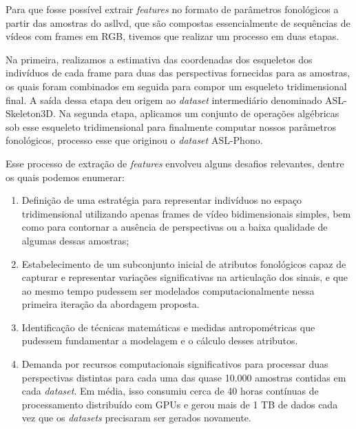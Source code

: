 Para que fosse possível extrair \textit{features} no formato de parâmetros fonológicos a partir das amostras do \acrshort{asllvd}, que são compostas essencialmente de sequências de vídeos com frames em RGB, tivemos que realizar um processo em duas etapas.

Na primeira, realizamos a estimativa das coordenadas dos esqueletos dos indivíduos de cada frame para duas das perspectivas fornecidas para as amostras, os quais foram combinados em seguida para compor um esqueleto tridimensional final. A saída dessa etapa deu origem ao \textit{dataset} intermediário denominado ASL-Skeleton3D.
Na segunda etapa, aplicamos um conjunto de operações algébricas sob esse esqueleto tridimensional para finalmente computar nossos parâmetros fonológicos, processo esse que originou o \textit{dataset} ASL-Phono.


Esse processo de extração de \textit{features} envolveu alguns desafios relevantes, dentre os quais podemos enumerar:

\begin{enumerate}
    \item Definição de uma estratégia para representar indivíduos no espaço tridimensional utilizando apenas frames de vídeo bidimensionais simples, bem como para contornar a ausência de perspectivas ou a baixa qualidade de algumas dessas amostras;

    \item Estabelecimento de um subconjunto inicial de atributos fonológicos capaz de capturar e representar variações significativas na articulação dos sinais, e que ao mesmo tempo pudessem ser modelados computacionalmente nessa primeira iteração da abordagem proposta.

    \item Identificação de técnicas matemáticas e medidas antropométricas que pudessem fundamentar a modelagem e o cálculo desses atributos.

    \item Demanda por recursos computacionais significativos para processar duas perspectivas distintas para cada uma das quase 10.000 amostras contidas em cada \textit{dataset}. Em média, isso consumiu cerca de 40 horas contínuas de processamento distribuído com GPUs e gerou mais de 1 TB de dados cada vez que os \textit{datasets} precisaram ser gerados novamente.
\end{enumerate}





